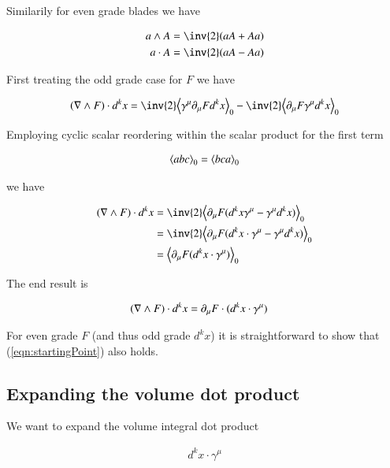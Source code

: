 Similarily for even grade blades we have

\begin{align*}
a \wedge A = \inv{2} (a A + A a) \\
a \cdot A = \inv{2} (a A - A a)
\end{align*}

First treating the odd grade case for $F$ we have

\begin{align*}
( \grad \wedge F ) \cdot d^k x
&=
\inv{2} \gpgradezero{ \gamma^\mu \partial_\mu F d^k x } - \inv{2} \gpgradezero{ \partial_\mu F \gamma^\mu d^k x } \\
\end{align*}

Employing cyclic scalar reordering within the scalar product for the first term

\begin{align}
{\left\langle{{a b c}}\right\rangle}_{0} = {\left\langle{{b c a}}\right\rangle}_{0}
\end{align}

we have

\begin{align*}
( \grad \wedge F ) \cdot d^k x
&=
\inv{2} \gpgradezero{ \partial_\mu F (d^k x \gamma^\mu - \gamma^\mu d^k x)} \\
&=
\inv{2} \gpgradezero{ \partial_\mu F (d^k x \cdot \gamma^\mu - \gamma^\mu d^k x)} \\
&=
\gpgradezero{ \partial_\mu F (d^k x \cdot \gamma^\mu)} \\
\end{align*}

The end result is 

\begin{align}\label{eqn:startingPoint}
( \nabla \wedge F ) \cdot d^k x &= \partial_\mu F \cdot (d^k x \cdot \gamma^\mu) 
\end{align}

For even grade $F$ (and thus odd grade $d^k x$) it is straightforward to show that (\ref{eqn:startingPoint}) also holds.

\subsection{Expanding the volume dot product}

We want to expand the volume integral dot product

\begin{align}
d^k x \cdot \gamma^\mu
\end{align}

